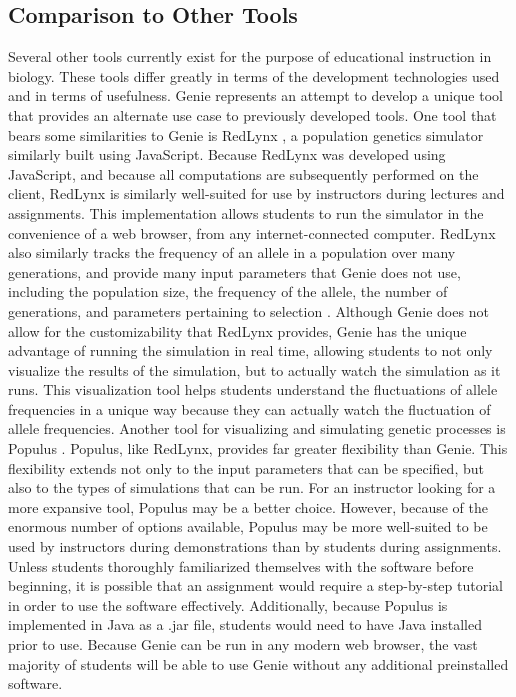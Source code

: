 \documentclass[12pt]{article}
\begin{document}
\begin{spacing}{1.6}
\subsection{Comparison to Other Tools}
Several other tools currently exist for the purpose of educational instruction in biology. These tools differ greatly in terms of the development technologies used and in terms of usefulness. Genie represents an attempt to develop a unique tool that provides an alternate use case to previously developed tools. One tool that bears some similarities to Genie is RedLynx \cite{redlynx}, a population genetics simulator similarly built using JavaScript. Because RedLynx was developed using JavaScript, and because all computations are subsequently performed on the client, RedLynx is similarly well-suited for use by instructors during lectures and assignments. This implementation allows students to run the simulator in the convenience of a web browser, from any internet-connected computer. RedLynx also similarly tracks the frequency of an allele in a population over many generations, and provide many input parameters that Genie does not use, including the population size, the frequency of the allele, the number of generations, and parameters pertaining to selection \cite{redlynx}. Although Genie does not allow for the customizability that RedLynx provides, Genie has the unique advantage of running the simulation in real time, allowing students to not only visualize the results of the simulation, but to actually watch the simulation as it runs. This visualization tool helps students understand the fluctuations of allele frequencies in a unique way because they can actually watch the fluctuation of allele frequencies.\newline
\newline
Another tool for visualizing and simulating genetic processes is Populus \cite{populus}. Populus, like RedLynx, provides far greater flexibility than Genie. This flexibility extends not only to the input parameters that can be specified, but also to the types of simulations that can be run. For an instructor looking for a more expansive tool, Populus may be a better choice. However, because of the enormous number of options available, Populus may be more well-suited to be used by instructors during demonstrations than by students during assignments. Unless students thoroughly familiarized themselves with the software before beginning, it is possible that an assignment would require a step-by-step tutorial in order to use the software effectively. Additionally, because Populus is implemented in Java as a .jar file, students would need to have Java installed prior to use. Because Genie can be run in any modern web browser, the vast majority of students will be able to use Genie without any additional preinstalled software.\newline

\end{spacing}
\end{document}
